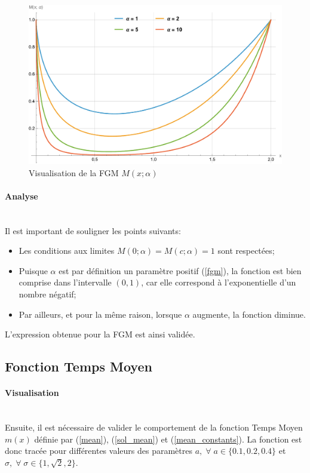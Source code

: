 \begin{figure}[htb]
    \centering
    \includegraphics[width=0.5\linewidth]{img/validation/fgm.pdf}
    \caption{Visualisation de la \acl{FGM} $M(x;\alpha)$}\label{fig:FGMVisualisation}
\end{figure}
\FloatBarrier\paragraph{Analyse}\phantom{}\\
Il est important de souligner les points suivants:
\begin{itemize}
    \item Les conditions aux limites $M(0; \alpha) = M(c; \alpha) = 1$ sont respectées;
    \item Puisque $\alpha$ est par définition un paramètre positif (\ref{fgm}), la fonction est bien comprise dans l'intervalle $(0, 1)$, car elle correspond à l'exponentielle d'un nombre négatif; 
    \item Par ailleurs, et pour la même raison, lorsque $\alpha$ augmente, la fonction diminue.
\end{itemize}

L'expression obtenue pour la \acl{FGM} est ainsi validée. 


\subsection{Fonction Temps Moyen}

\paragraph{Visualisation}\phantom{}\\
Ensuite, il est nécessaire de valider le comportement de la fonction Temps Moyen $m(x)$ définie par (\ref{mean}), (\ref{sol_mean}) et (\ref{mean_constants}). La fonction est donc tracée pour différentes valeurs des paramètres $a,\;\forall\;a\in\{0.1,0.2,0.4\}$ et $\sigma,\;\forall\;\sigma\in\{1,\sqrt{2},2\}$.


